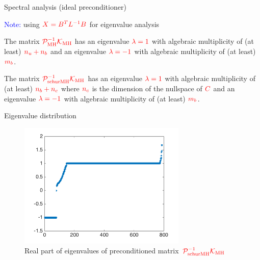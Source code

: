 \documentclass[12pt]{beamer}
\newcommand{\re}[1]{{\textcolor{red}       {#1}}}
\newcommand{\bl}[1]{{\textcolor{blue}{#1}}}
\begin{document}
\begin{frame}{Spectral analysis (ideal preconditioner)}

\bl{Note:} using $\re{X = B^T L^{-1} B}$ for eigenvalue analysis

\begin{theorem}
\label{thm:mhd_outer_ideal}
The matrix $\re{\mathcal{P}_{\rm MH}^{-1} \mathcal{K}_{\rm MH} }$ has an eigenvalue $\re{\lambda = 1}$ with algebraic multiplicity of (at least) $\re{n_u + n_b}$ and an eigenvalue $\re{\lambda = -1}$ with  algebraic multiplicity of (at least) $\re{m_b}$.
\end{theorem}

\begin{theorem}
\label{thm:mhd_outer_schur}
The matrix $\re{\mathcal{P}_{\rm schurMH}^{-1} \mathcal{K}_{\rm MH}} $ has an eigenvalue $\re{\lambda = 1}$ with algebraic multiplicity of (at least) $\re{n_b+n_c}$ where $\re{n_c}$ is the dimension of the nullspace of $\re{C}$ and an eigenvalue $\re{\lambda = -1}$ with  algebraic multiplicity of (at least) $\re{m_b}$.
\end{theorem}
\end{frame}

\begin{frame}{Eigenvalue distribution}

\begin{figure}[h]
    \begin{center}
    \includegraphics[width=80mm]{figures/Eigen}

    \caption{Real part of eigenvalues of preconditioned matrix~$\re{\mathcal{P}_{\rm schurMH}^{-1} \mathcal{K}_{\rm MH}}$ }
    \end{center}
\end{figure}




\end{frame}
\end{document}
